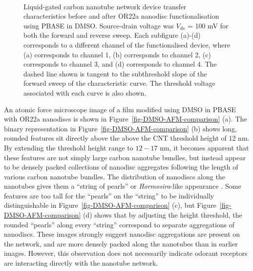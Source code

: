 \documentclass[
  a4paper,
]{scrbook}
\begin{document}
\begin{figure}
\begin{minipage}[t]{0.45\linewidth}
{{}

}

\end{minipage}%
%
\begin{minipage}[t]{0.01\linewidth}

{\centering 

~

}

\end{minipage}%

\caption[Liquid-gated carbon nanotube network device transfer
characteristics before and after OR22a nanodisc functionalisation using
PBASE in DMSO, with threshold voltage corresponding to each transfer
curve also shown.]{\label{fig-DMSO-TX}Liquid-gated carbon nanotube
network device transfer characteristics before and after OR22a nanodisc
functionalisation using PBASE in DMSO. Source-drain voltage was
\(V_{ds}\) = 100 mV for both the forward and reverse sweep. Each
subfigure (a)-(d) corresponds to a different channel of the
functionalised device, where (a) corresponds to channel 1, (b)
corresponds to channel 2, (c) corresponds to channel 3, and (d)
corresponds to channel 4. The dashed line shown is tangent to the
subthreshold slope of the forward sweep of the characteristic curve. The
threshold voltage associated with each curve is also shown.}

\end{figure}

An atomic force microscope image of a film modified using DMSO in PBASE
with OR22a nanodiscs is shown in Figure~\ref{fig-DMSO-AFM-comparison}
(a). The binary representation in Figure~\ref{fig-DMSO-AFM-comparison}
(b) shows long, rounded features sit directly above the above the CNT
threshold height of 12 nm. By extending the threshold height range to
\(12-17\) nm, it becomes apparent that these features are not simply
large carbon nanotube bundles, but instead appear to be densely packed
collections of nanodisc aggregates following the length of various
carbon nanotube bundles. The distribution of nanodiscs along the
nanotubes gives them a ``string of pearls'' or \emph{Hormosira}-like
appearance \autocite{NewZealandPlantConservationNetwork}. Some features
are too tall for the ``pearls'' on the ``string'' to be individually
distinguishable in Figure~\ref{fig-DMSO-AFM-comparison} (c), but
Figure~\ref{fig-DMSO-AFM-comparison} (d) shows that by adjusting the
height threshold, the rounded ``pearls'' along every ``string''
correspond to separate aggregations of nanodiscs. These images strongly
suggest nanodisc aggregations are present on the network, and are more
densely packed along the nanotubes than in earlier images. However, this
observation does not necessarily indicate odorant receptors are
interacting directly with the nanotube network.
\end{document}
